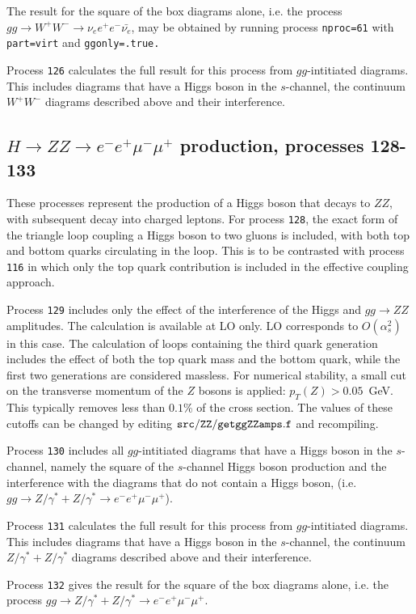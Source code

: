 \documentclass{article}
\begin{document}
The result for the square of the box diagrams alone, i.e. the process
$gg \to W^+W^- \to \nu_e e^+ e^- \bar{\nu_e}$, may be obtained by running process
{\tt nproc=61} with {\tt part=virt} and {\tt ggonly=.true.} 

Process {\tt 126} calculates the full result for this process from  $gg$-intitiated diagrams.
This includes diagrams that have a Higgs boson in the $s$-channel, the continuum $W^+W^-$
diagrams described above and their interference. 


\subsection{$H \to ZZ \to e^- e^+ \mu^- \mu^+$ production, processes 128-133}
These processes represent the production of a Higgs boson that decays to $Z Z$,
with subsequent decay into charged leptons. For process {\tt 128}, the exact form of the triangle
loop coupling a Higgs boson to two gluons is included, with both top and bottom quarks
circulating in the loop. This is to be contrasted with process {\tt 116} in which only the
top quark contribution is included in the effective coupling approach.

Process {\tt 129} includes only the effect of the interference of the
Higgs and $gg \to ZZ$ amplitudes.
The calculation is available at LO only. LO corresponds to $O(\alpha_s^2)$ in this case.
The calculation of loops containing the third quark generation
includes the effect of both the top quark mass and the bottom quark, while the first two
generations are considered massless. For numerical stability, a small cut on the
transverse momentum of the $Z$ bosons is applied: $p_T(Z)>0.05$~GeV.
This typically removes less than $0.1$\% of the cross section. The
values of these cutoffs can be changed by editing ${\tt src/ZZ/getggZZamps.f}$ and recompiling.

Process {\tt 130} includes all $gg$-intitiated diagrams that have a Higgs boson in the $s$-channel,
namely the square of the $s$-channel Higgs boson production and the interference with the diagrams
that do not contain a Higgs boson, (i.e. $gg \to Z/\gamma^*+Z/\gamma^* \to e^- e^+ \mu^- \mu^+$).

Process {\tt 131} calculates the full result for this process from  $gg$-intitiated diagrams.
This includes diagrams that have a Higgs boson in the $s$-channel, the continuum $ Z/\gamma^*+Z/\gamma^*$
diagrams described above and their interference. 

Process {\tt 132}  gives the result for the square of the box diagrams alone, i.e. the process
$gg \to Z/\gamma^*+Z/\gamma^* \to e^- e^+ \mu^- \mu^+$.
\end{document}
